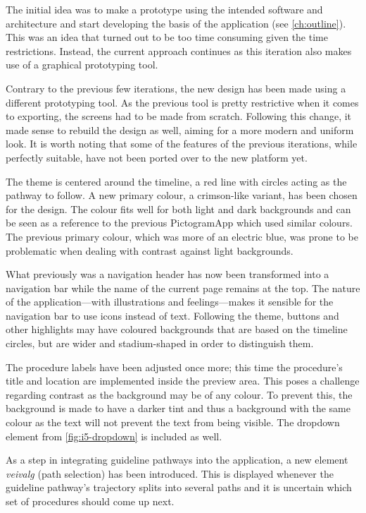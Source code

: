 The initial idea was to make a prototype using the intended software and architecture and start developing the basis of the application (see \autoref{ch:outline}). This was an idea that turned out to be too time consuming given the time restrictions. Instead, the current approach continues as this iteration also makes use of a graphical prototyping tool.

Contrary to the previous few iterations, the new design has been made using a different prototyping tool. As the previous tool is pretty restrictive when it comes to exporting, the screens had to be made from scratch. Following this change, it made sense to rebuild the design as well, aiming for a more modern and uniform look. It is worth noting that some of the features of the previous iterations, while perfectly suitable, have not been ported over to the new platform yet.

The theme is centered around the timeline, a red line with circles acting as the pathway to follow. A new primary colour, a crimson-like variant, has been chosen for the design. The colour fits well for both light and dark backgrounds and can be seen as a reference to the previous PictogramApp which used similar colours. The previous primary colour, which was more of an electric blue, was prone to be problematic when dealing with contrast against light backgrounds.

What previously was a navigation header has now been transformed into a navigation bar while the name of the current page remains at the top. The nature of the application---with illustrations and feelings---makes it sensible for the navigation bar to use icons instead of text. Following the theme, buttons and other highlights may have coloured backgrounds that are based on the timeline circles, but are wider and stadium-shaped in order to distinguish them.

The procedure labels have been adjusted once more; this time the procedure's title and location are implemented inside the preview area. This poses a challenge regarding contrast as the background may be of any colour. To prevent this, the background is made to have a darker tint and thus a background with the same colour as the text will not prevent the text from being visible. The dropdown element from \autoref{fig:i5-dropdown} is included as well.

As a step in integrating guideline pathways into the application, a new element \emph{veivalg} (path selection) has been introduced. This is displayed whenever the guideline pathway's trajectory splits into several paths and it is uncertain which set of procedures should come up next.

